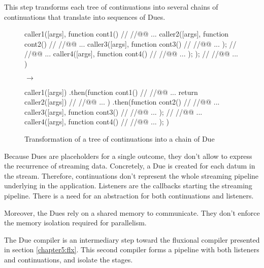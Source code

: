 This step transforms each tree of continuations into several chains of continuations that translate into sequences of Dues.

\begin{figure}[h!]
    \begin{minipage}{0.42\textwidth}
      \centering
      \begin{code}[js, caption={Nested calls of continuations},label={lst:nest-cint}]%
caller1([args], function cont1(){
  // //@@ ...
  caller2([args], function cont2(){
    // //@@ ...
    caller3([args], function cont3(){
      // //@@ ...
    });
    // //@@ ...
    caller4([args], function cont4(){
      // //@@ ...
    });
  });
  // //@@ ...
})\end{code}
    \end{minipage}
    \hfill
    $\to$
    \hfill
    \begin{minipage}{0.42\textwidth}
      \centering
      \begin{code}[js, caption={Chain of Due},label={lst:nest-cint}]%
caller1([args])
.then(function cont1(){
  // //@@ ...
  return caller2([args])
  // //@@ ...
})
.then(function cont2(){
  // //@@ ...
  caller3([args], function cont3(){
    // //@@ ...
  });
  // //@@ ...
  caller4([args], function cont4(){
    // //@@ ...
  });
})\end{code}
    \end{minipage}
    \caption{Transformation of a tree of continuations into a chain of Due}
    \label{fig:tree-to-chain}
\end{figure}


\separator


Because Dues are placeholders for a single outcome, they don't allow to express the recurrence of streaming data.
Concretely, %
a Due is created for each datum in the stream.
Therefore, continuations don't represent the whole streaming pipeline underlying in the application.
Listeners are the callbacks starting the streaming pipeline.
There is a need for an abstraction for both continuations and listeners.

Moreover, the Dues rely on a shared memory to communicate.
They don't enforce the memory isolation required for parallelism.

The Due compiler is an intermediary step toward the fluxional compiler presented in section \ref{chapter5:flx}.
This second compiler forms a pipeline with both listeners and continuations, and isolate the stages.

